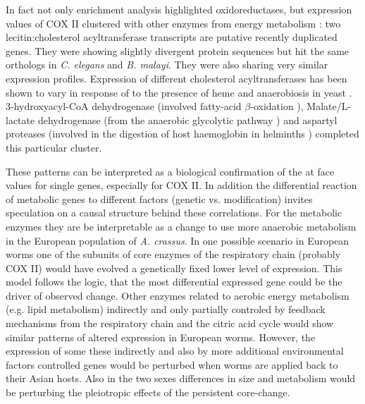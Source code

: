 In fact not only enrichment analysis highlighted oxidoreductases, but
expression values of COX II clustered with other enzymes from energy
metabolism : two lecitin:cholesterol acyltransferase transcripts are
putative recently duplicated genes. They were showing slightly
divergent protein sequences but hit the same orthologs in
\textit{C. elegans} and \textit{B. malayi}. They were also sharing
very similar expression profiles. Expression of different cholesterol
acyltransferases has been shown to vary in response of to the presence
of heme and anaerobiosis in yeast
\cite{pmid11786267}. 3-hydroxyacyl-CoA dehydrogenase (involved
fatty-acid $\beta$-oxidation \cite{pmid8454629}), Malate/L-lactate
dehydrogenase (from the anaerobic glycolytic pathway
\cite{sturm1969vergleichende}) and aspartyl proteases (involved in the
digestion of host haemoglobin in helminths \cite{pmid12782060})
completed this particular cluster.

These patterns can be interpreted as a biological confirmation of the
at face values for single genes, especially for COX II. In addition
the differential reaction of metabolic genes to different factors
(genetic vs. modification) invites speculation on a causal structure
behind these correlations. For the metabolic enzymes they are be
interpretable as a change to use more anaerobic metabolism in the
European population of \textit{A. crassus}. In one possible scenario
in European worms one of the subunits of core enzymes of the
respiratory chain (probably COX II) would have evolved a genetically
fixed lower level of expression. This model follows the logic, that
the most differential expressed gene could be the driver of observed
change. Other enzymes related to aerobic energy metabolism (e.g. lipid
metabolism) indirectly and only partially controled by feedback
mechanisms from the respiratory chain and the citric acid cycle would
show similar patterns of altered expression in European
worms. However, the expression of some these indirectly and also by
more additional environmental factors controlled genes would be
perturbed when worms are applied back to their Asian hosts. Also in
the two sexes differences in size and metabolism would be perturbing
the pleiotropic effects of the persistent core-change.


